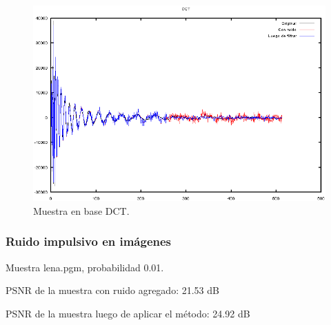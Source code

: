 \documentclass[a4paper,10pt,twoside]{article}
\begin{document}
\begin{figure}[H]
  \centering
  \includegraphics[width=15cm]{graficos/dopp_impulsivo_atenuar_dct.png} 
  \caption{Muestra en base DCT.}
\end{figure}


\subsubsection{Ruido impulsivo en imágenes}

Muestra lena.pgm, probabilidad 0.01.

PSNR de la muestra con ruido agregado: 21.53 dB

PSNR de la muestra luego de aplicar el método: 24.92 dB
\end{document}
